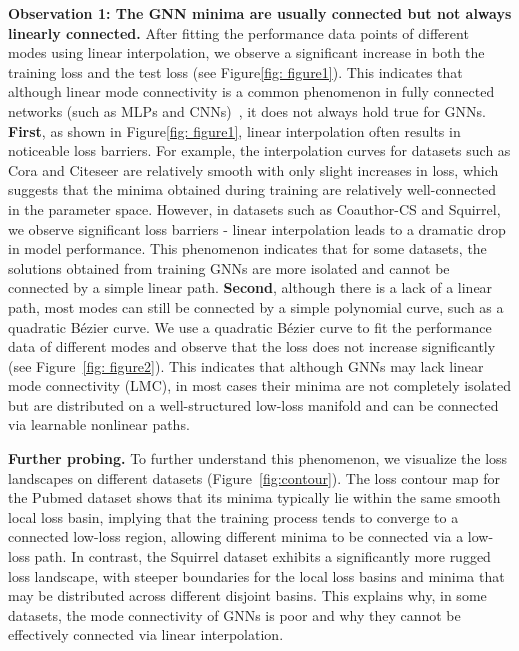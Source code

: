 \noindent\textbf{Observation 1: The GNN minima are usually connected but not always linearly connected.} 
After fitting the performance data points of different modes using linear interpolation, we observe a significant increase in both the training loss and the test loss (see Figure\ref{fig: figure1}). This indicates that although linear mode connectivity is a common phenomenon in fully connected networks (such as MLPs and CNNs)~\citep{frankle2020linear, yunis2022convexity}, it does not always hold true for GNNs. \textbf{First}, as shown in Figure\ref{fig: figure1}, 
linear interpolation often results in noticeable loss barriers. For example, the interpolation curves for datasets such as Cora and Citeseer are relatively smooth with only slight increases in loss, which suggests that the minima obtained during training are relatively well-connected in the parameter space. However, in datasets such as Coauthor-CS and Squirrel, we observe significant loss barriers - linear interpolation leads to a dramatic drop in model performance. This phenomenon indicates that for some datasets, the solutions obtained from training GNNs are more isolated and cannot be connected by a simple linear path. \textbf{Second}, although there is a lack of a linear path, most modes can still be connected by a simple polynomial curve, such as a quadratic Bézier curve. We use a quadratic Bézier curve to fit the performance data of different modes and observe that the loss does not increase significantly (see Figure \ref{fig: figure2}). This indicates that although GNNs may lack linear mode connectivity (LMC), in most cases their minima are not completely isolated but are distributed on a well-structured low-loss manifold and can be connected via learnable nonlinear paths.

\textbf{Further probing.} To further understand this phenomenon, we visualize the loss landscapes on different datasets (Figure \ref{fig:contour}). The loss contour map for the Pubmed dataset shows that its minima typically lie within the same smooth local loss basin, implying that the training process tends to converge to a connected low-loss region, allowing different minima to be connected via a low-loss path. In contrast, the Squirrel dataset exhibits a significantly more rugged loss landscape, with steeper boundaries for the local loss basins and minima that may be distributed across different disjoint basins. This explains why, in some datasets, the mode connectivity of GNNs is poor and why they cannot be effectively connected via linear interpolation.



